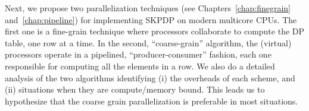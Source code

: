 Next, we propose two parallelization techniques (see
Chapters~\ref{chap:finegrain} and~\ref{chap:pipeline}) for implementing SKPDP on
modern multicore CPUs.  The first one is a fine-grain technique where
processors collaborate to compute the DP table, one row at a time.  In the
second, ``coarse-grain'' algorithm, the (virtual) processors operate in a
pipelined, ``producer-consumer'' fashion, each one responsible for computing
all the elements in a row.  We also do a detailed analysis of the two
algorithms identifying (i) the overheads of each scheme, and (ii) situations
when they are compute/memory bound.  This leads us to hypothesize that the
coarse grain parallelization is preferable in most situations.

